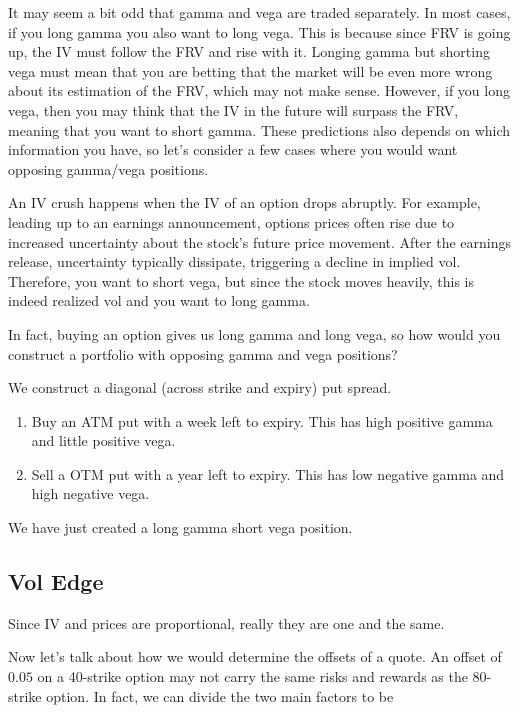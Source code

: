 \documentclass{article}
\begin{document}
    It may seem a bit odd that gamma and vega are traded separately. In most cases, if you long gamma you also want to long vega. This is because since FRV is going up, the IV must follow the FRV and rise with it. Longing gamma but shorting vega must mean that you are betting that the market will be even more wrong about its estimation of the FRV, which may not make sense. However, if you long vega, then you may think that the IV in the future will surpass the FRV, meaning that you want to short gamma. These predictions also depends on which information you have, so let's consider a few cases where you would want opposing gamma/vega positions.

    \begin{example}[IV Crush]
      An IV crush happens when the IV of an option drops abruptly. For example, leading up to an earnings announcement, options prices often rise due to increased uncertainty about the stock's future price movement. After the earnings release, uncertainty typically dissipate, triggering a decline in implied vol. Therefore, you want to short vega, but since the stock moves heavily, this is indeed realized vol and you want to long gamma.
    \end{example}

    In fact, buying an option gives us long gamma and long vega, so how would you construct a portfolio with opposing gamma and vega positions?

    \begin{example}
      We construct a diagonal (across strike and expiry) put spread.
      \begin{enumerate}
        \item Buy an ATM put with a week left to expiry. This has high positive gamma and little positive vega.
        \item Sell a OTM put with a year left to expiry. This has low negative gamma and high negative vega.
      \end{enumerate}
      We have just created a long gamma short vega position.
    \end{example}

  \subsection{Vol Edge}

    Since IV and prices are proportional, really they are one and the same. 

    Now let's talk about how we would determine the offsets of a quote. An offset of $0.05$ on a 40-strike option may not carry the same risks and rewards as the 80-strike option. In fact, we can divide the two main factors to be
\end{document}
